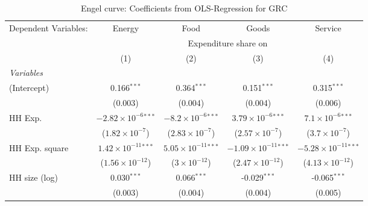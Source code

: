 
\begin{table}[htbp!]
   \centering
   \small
   \begin{adjustbox}{width = 1\textwidth, max height = 0.95\textheight, center}
      \begin{threeparttable}[b]
         \caption{\label{tab:Engel_parametric_GRC} Engel curve: Coefficients from OLS-Regression for GRC}
         \begin{tabular}{lcccc}
            \tabularnewline \midrule \midrule
            Dependent Variables: & Energy                         & Food                           & Goods                           & Service\\  
             & \multicolumn{4}{c}{Expenditure share on} \\ 
                                 & (1)                            & (2)                            & (3)                             & (4)\\  
            \midrule
            \emph{Variables}\\
            (Intercept)          & 0.166$^{***}$                  & 0.364$^{***}$                  & 0.151$^{***}$                   & 0.315$^{***}$\\   
                                 & (0.003)                        & (0.004)                        & (0.004)                         & (0.006)\\   
            HH Exp.              & $-2.82\times 10^{-6}$$^{***}$  & $-8.2\times 10^{-6}$$^{***}$   & $3.79\times 10^{-6}$$^{***}$    & $7.1\times 10^{-6}$$^{***}$\\    
                                 & ($1.82\times 10^{-7}$)         & ($2.83\times 10^{-7}$)         & ($2.57\times 10^{-7}$)          & ($3.7\times 10^{-7}$)\\    
            HH Exp. square       & $1.42\times 10^{-11}$$^{***}$  & $5.05\times 10^{-11}$$^{***}$  & $-1.09\times 10^{-11}$$^{***}$  & $-5.28\times 10^{-11}$$^{***}$\\    
                                 & ($1.56\times 10^{-12}$)        & ($3\times 10^{-12}$)           & ($2.47\times 10^{-12}$)         & ($4.13\times 10^{-12}$)\\    
            HH size (log)        & 0.030$^{***}$                  & 0.066$^{***}$                  & -0.029$^{***}$                  & -0.065$^{***}$\\   
                                 & (0.003)                        & (0.004)                        & (0.004)                         & (0.005)\\   

\end{tabular}
\end{threeparttable}
\end{adjustbox}
\end{table}
